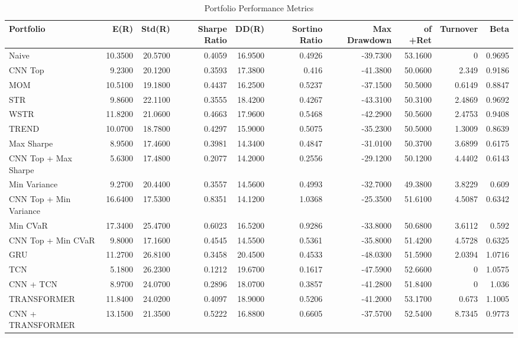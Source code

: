 \begin{table}[htbp]
\centering
\caption{Portfolio Performance Metrics}
\begin{tabular}{lrrrrrrrrr}
\hline
Portfolio & E(R) & Std(R) & Sharpe Ratio & DD(R) & Sortino Ratio & Max Drawdown &  of +Ret & Turnover & Beta \\
\hline
Naive & 10.3500 & 20.5700 & 0.4059 & 16.9500 & 0.4926 & -39.7300 & 53.1600 & 0 & 0.9695 \\
CNN Top & 9.2300 & 20.1200 & 0.3593 & 17.3800 & 0.416 & -41.3800 & 50.0600 & 2.349 & 0.9186 \\
MOM & 10.5100 & 19.1800 & 0.4437 & 16.2500 & 0.5237 & -37.1500 & 50.5000 & 0.6149 & 0.8847 \\
STR & 9.8600 & 22.1100 & 0.3555 & 18.4200 & 0.4267 & -43.3100 & 50.3100 & 2.4869 & 0.9692 \\
WSTR & 11.8200 & 21.0600 & 0.4663 & 17.9600 & 0.5468 & -42.2900 & 50.5600 & 2.4753 & 0.9408 \\
TREND & 10.0700 & 18.7800 & 0.4297 & 15.9000 & 0.5075 & -35.2300 & 50.5000 & 1.3009 & 0.8639 \\
Max Sharpe & 8.9500 & 17.4600 & 0.3981 & 14.3400 & 0.4847 & -31.0100 & 50.3700 & 3.6899 & 0.6175 \\
CNN Top + Max Sharpe & 5.6300 & 17.4800 & 0.2077 & 14.2000 & 0.2556 & -29.1200 & 50.1200 & 4.4402 & 0.6143 \\
Min Variance & 9.2700 & 20.4400 & 0.3557 & 14.5600 & 0.4993 & -32.7000 & 49.3800 & 3.8229 & 0.609 \\
CNN Top + Min Variance & 16.6400 & 17.5300 & 0.8351 & 14.1200 & 1.0368 & -25.3500 & 51.6100 & 4.5087 & 0.6342 \\
Min CVaR & 17.3400 & 25.4700 & 0.6023 & 16.5200 & 0.9286 & -33.8000 & 50.6800 & 3.6112 & 0.592 \\
CNN Top + Min CVaR & 9.8000 & 17.1600 & 0.4545 & 14.5500 & 0.5361 & -35.8000 & 51.4200 & 4.5728 & 0.6325 \\
GRU & 11.2700 & 26.8100 & 0.3458 & 20.4500 & 0.4533 & -48.0300 & 51.5900 & 2.0394 & 1.0716 \\
TCN & 5.1800 & 26.2300 & 0.1212 & 19.6700 & 0.1617 & -47.5900 & 52.6600 & 0 & 1.0575 \\
CNN + TCN & 8.9700 & 24.0700 & 0.2896 & 18.0700 & 0.3857 & -41.2800 & 51.8400 & 0 & 1.036 \\
TRANSFORMER & 11.8400 & 24.0200 & 0.4097 & 18.9000 & 0.5206 & -41.2000 & 53.1700 & 0.673 & 1.1005 \\
CNN + TRANSFORMER & 13.1500 & 21.3500 & 0.5222 & 16.8800 & 0.6605 & -37.5700 & 52.5400 & 8.7345 & 0.9773 \\
\hline
\end{tabular}
\end{table}